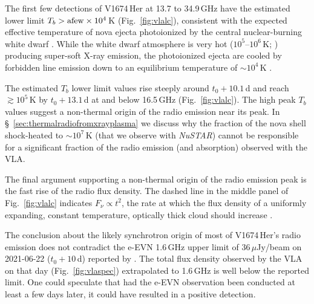 \documentclass[a4paper,fleqn,usenatbib]{mnras}
\newcommand{\nova}{V1674\,Her}
\begin{document}
The first few detections of \nova{} at 13.7 to 34.9\,GHz have the estimated lower limit
$T_b > {\rm a few} \times 10^4$\,K (Fig.~\ref{fig:vlalc}),
consistent with the expected effective temperature of nova ejecta photoionized by
the central nuclear-burning white dwarf \citep{2015ApJ...803...76C}.
While the white dwarf atmosphere is very hot 
($10^5$--$10^6$\,K; \citealt{2013ApJ...777..136W,2015ApJ...803...76C}) producing 
super-soft X-ray emission, the photoionized ejecta are cooled by forbidden line emission 
down to an equilibrium temperature of $\sim 10^4$\,K \citep{1997pism.book.....D,2014A&A...561A..10P}.

The estimated $T_b$ lower limit values rise steeply around $t_0+10.1$\,d and reach $\gtrsim 10^5$\,K 
by $t_0+13.1$\,d at and below 16.5\,GHz (Fig.~\ref{fig:vlalc}). 
The high peak $T_b$ values suggest a non-thermal origin of the radio emission near its peak.
%
In \S~\ref{sec:thermalradiofromxrayplasma} we discuss why the fraction of
the nova shell shock-heated to $\sim 10^7$\,K (that we observe with {\em NuSTAR})
cannot be responsible for a significant fraction of the radio emission 
(and absorption) observed with the VLA.

The final argument supporting a non-thermal origin of the radio emission peak is
the fast rise of the radio flux density. The dashed line in the middle panel of Fig.~\ref{fig:vlalc}
indicates $F_\nu \propto t^2$, the rate at which the flux density of a uniformly
expanding, constant temperature, optically thick cloud should increase \citep[e.g.][]{Seaquist_Bode_2008}. 

The conclusion about the likely synchrotron origin of most of \nova{}'s
radio emission does not contradict the e-EVN 1.6\,GHz upper limit of 
36\,$\mu$Jy/beam on 2021-06-22 ($t_0 + 10$\,d) reported by \cite{2021ATel14758....1P}.
The total flux density observed by the VLA on that day (Fig.~\ref{fig:vlaspec})
extrapolated to 1.6\,GHz is well below the reported limit. One could
speculate that had the e-EVN observation been conducted at least a few days
later, it could have resulted in a positive detection.
\end{document}
